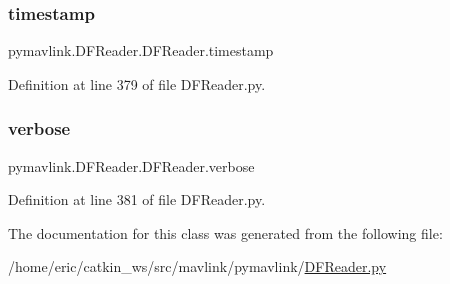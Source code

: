\subsubsection{\texorpdfstring{timestamp}{timestamp}}
{\footnotesize\ttfamily pymavlink.\+D\+F\+Reader.\+D\+F\+Reader.\+timestamp}



Definition at line 379 of file D\+F\+Reader.\+py.

\mbox{\label{classpymavlink_1_1DFReader_1_1DFReader_abbad566e5d37a3d4582cbb7283a53feb}} 
\subsubsection{\texorpdfstring{verbose}{verbose}}
{\footnotesize\ttfamily pymavlink.\+D\+F\+Reader.\+D\+F\+Reader.\+verbose}



Definition at line 381 of file D\+F\+Reader.\+py.



The documentation for this class was generated from the following file\+:\begin{DoxyCompactItemize}
\item 
/home/eric/catkin\+\_\+ws/src/mavlink/pymavlink/\mbox{\hyperlink{DFReader_8py}{D\+F\+Reader.\+py}}\end{DoxyCompactItemize}

